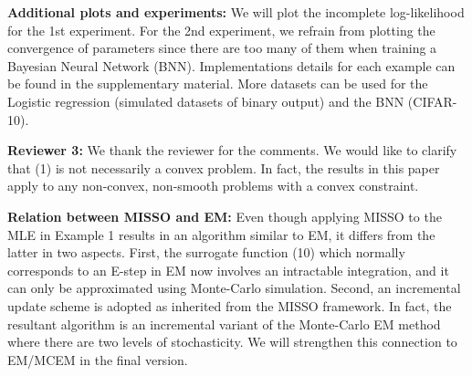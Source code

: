 \documentclass{article}
\begin{document}


\textbf{Additional plots and experiments:} We will plot the incomplete log-likelihood for the 1st experiment. For the 2nd experiment, we refrain from plotting the convergence of  parameters since there are too many of them when training a Bayesian Neural Network (BNN).
Implementations details for each example can be found in the supplementary material. 
More datasets can be used for the Logistic regression (simulated datasets of binary output) and the BNN (CIFAR-10). 

\textbf{\textcolor{green!50!black}{Reviewer 3:}} We thank the reviewer for the comments. We would like to clarify that (1) is not necessarily a convex problem. In fact, the results in this paper apply to any non-convex, non-smooth problems with a convex constraint. 

\textbf{Relation between MISSO and EM:} Even though applying MISSO to the MLE in Example 1 results in an algorithm similar to EM, it differs from the latter in two aspects. First, the surrogate function (10) which normally corresponds to an E-step in EM now involves an intractable integration, and it can only be approximated using Monte-Carlo simulation. Second, an incremental update scheme is adopted as inherited from the MISSO framework. 
In fact, the resultant algorithm is an incremental variant of the Monte-Carlo EM method where there are two levels of stochasticity. 
We will strengthen this connection to EM/MCEM in the final version.

\end{document}
